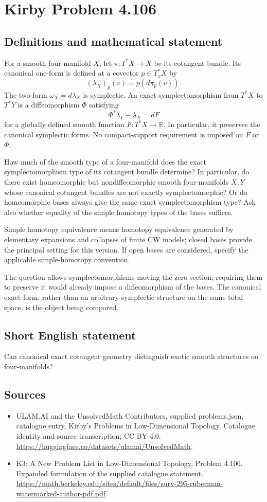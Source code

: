 \documentclass[11pt,a4paper]{article}
\begin{document}
\section*{Kirby Problem 4.106}\label{statement}

\subsection{Definitions and mathematical statement}
For a smooth four-manifold $X$, let $\pi:T^*X\to X$ be its cotangent bundle. Its canonical one-form is defined at a covector $p\in T_x^*X$ by
\[
(\lambda_X)_p(v)=p(d\pi_p(v)).
\]
The two-form $\omega_X=d\lambda_X$ is symplectic. An exact symplectomorphism from $T^*X$ to $T^*Y$ is a diffeomorphism $\Phi$ satisfying
\[
\Phi^*\lambda_Y-\lambda_X=dF
\]
for a globally defined smooth function $F:T^*X\to\mathbb R$. In particular, it preserves the canonical symplectic forms. No compact-support requirement is imposed on $F$ or $\Phi$.

How much of the smooth type of a four-manifold does the exact symplectomorphism type of its cotangent bundle determine? In particular, do there exist homeomorphic but nondiffeomorphic smooth four-manifolds $X,Y$ whose canonical cotangent bundles are not exactly symplectomorphic? Or do homeomorphic bases always give the same exact symplectomorphism type? Ask also whether equality of the simple homotopy types of the bases suffices.

Simple homotopy equivalence means homotopy equivalence generated by elementary expansions and collapses of finite CW models; closed bases provide the principal setting for this version. If open bases are considered, specify the applicable simple-homotopy convention.

The question allows symplectomorphisms moving the zero section; requiring them to preserve it would already impose a diffeomorphism of the bases. The canonical exact form, rather than an arbitrary symplectic structure on the same total space, is the object being compared.
\subsection{Short English statement}
Can canonical exact cotangent geometry distinguish exotic smooth structures on four-manifolds?
\subsection{Sources}
\begin{itemize}
\item[S1] ULAM.AI and the UnsolvedMath Contributors, supplied problems.json, catalogue entry, Kirby's Problems in Low-Dimensional Topology. Catalogue identity and source transcription; CC BY 4.0.
\url{https://huggingface.co/datasets/ulamai/UnsolvedMath}.
\item[S2] K3: A New Problem List in Low-Dimensional Topology, Problem 4.106. Expanded formulation of the supplied catalogue statement.
\url{https://math.berkeley.edu/sites/default/files/surv-295-ruberman-watermarked-author-pdf.pdf}.
\end{itemize}
\end{document}
